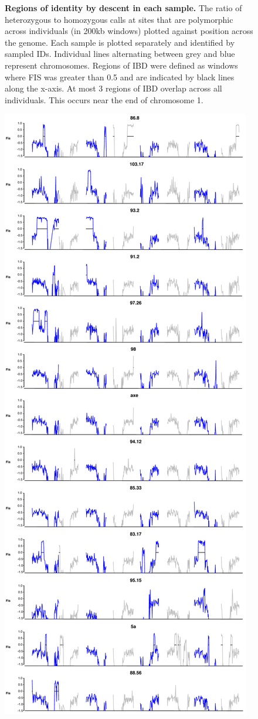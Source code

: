 \begin{figure}[ht!]
    \caption{\textbf{Regions of identity by descent in each sample.} The ratio of heterozygous to homozygous calls at sites that are polymorphic across individuals (in 200kb windows) plotted against position across the genome. Each sample is plotted separately and identified by sampled IDs. Individual lines alternating between grey and blue represent chromosomes. Regions of IBD were defined as windows where FIS was greater than 0.5 and are indicated by black lines along the x-axis. At most 3 regions of IBD overlap across all individuals. This occurs near the end of chromosome 1.}
    \label{fig:figS4}
\end{figure}

\begin{figure}[ht!]
      \centering
       \includegraphics[scale=0.1]{Ch2FigS5}

\end{figure}
